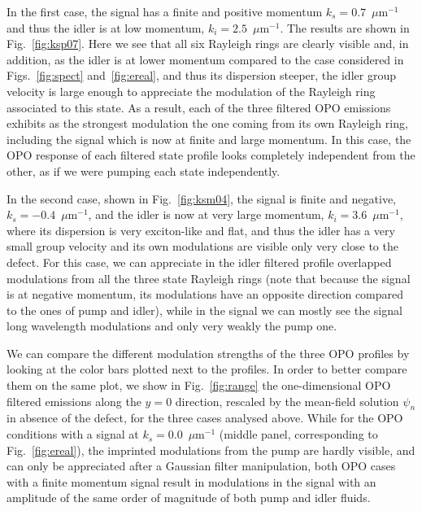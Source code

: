 \begin{subappendices}
In the first case, the signal has a finite and positive momentum $k_s
= 0.7$~$\mu$m$^{-1}$ and thus the idler is at low momentum, $k_i
=2.5$~$\mu$m$^{-1}$. The results are shown in Fig.~\ref{fig:ksp07}.
%
Here we see that all six Rayleigh rings are clearly visible and, in
addition, as the idler is at lower momentum compared to the case
considered in Figs.~\ref{fig:spect} and~\ref{fig:ereal}, and thus its
dispersion steeper, the idler group velocity is large enough to
appreciate the modulation of the Rayleigh ring associated to this
state. As a result, each of the three filtered OPO emissions exhibits
as the strongest modulation the one coming from its own Rayleigh ring,
including the signal which is now at finite and large momentum. In this
case, the OPO response of each filtered state profile looks completely
independent from the other, as if we were pumping each state
independently.

In the second case, shown in Fig.~\ref{fig:ksm04}, the signal is
finite and negative, $k_s = -0.4$~$\mu$m$^{-1}$, and the idler is now
at very large momentum, $k_i = 3.6$~$\mu$m$^{-1}$, where its
dispersion is very exciton-like and flat, and thus the idler has a
very small group velocity and its own modulations are visible only
very close to the defect. For this case, we can appreciate in the
idler filtered profile overlapped modulations from all the three state
Rayleigh rings (note that because the signal is at negative momentum,
its modulations have an opposite direction compared to the ones of
pump and idler), while in the signal we can mostly see the signal long
wavelength modulations and only very weakly the pump one.

We can compare the different modulation strengths of the three OPO
profiles by looking at the color bars plotted next to the profiles. In
order to better compare them on the same plot, we show in
Fig.~\ref{fig:range} the one-dimensional OPO filtered emissions along
the $y=0$ direction, rescaled by the mean-field solution $\psi_n$ in
absence of the defect, for the three cases analysed above. While for
the OPO conditions with a signal at $k_s = 0.0$~$\mu$m$^{-1}$ (middle
panel, corresponding to Fig.~\ref{fig:ereal}), the imprinted
modulations from the pump are hardly visible, and can only be
appreciated after a Gaussian filter manipulation, both OPO cases with
a finite momentum signal result in modulations in the signal with an
amplitude of the same order of magnitude of both pump and idler
fluids.


\end{subappendices}
